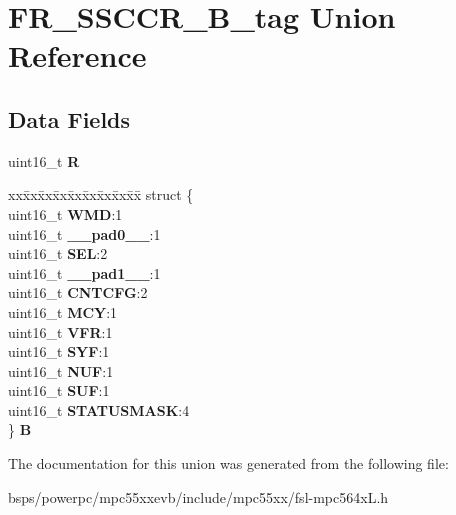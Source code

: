 \hypertarget{unionFR__SSCCR__16B__tag}{}\section{F\+R\+\_\+\+S\+S\+C\+C\+R\+\_\+B\+\_\+tag Union Reference}
\label{unionFR__SSCCR__16B__tag}
\subsection*{Data Fields}
\begin{DoxyCompactItemize}
\item 
\mbox{\label{unionFR__SSCCR__16B__tag_af067eafb4e46d3d5efeea3468877fbe4}} 
uint16\+\_\+t {\bfseries R}
\item 
\mbox{\label{unionFR__SSCCR__16B__tag_ab65ed3b735d5a0c631e1bf417d67ce4c}} 
\begin{tabbing}
xx\=xx\=xx\=xx\=xx\=xx\=xx\=xx\=xx\=\kill
struct \{\\
\>uint16\_t {\bfseries WMD}:1\\
\>uint16\_t {\bfseries \_\_pad0\_\_}:1\\
\>uint16\_t {\bfseries SEL}:2\\
\>uint16\_t {\bfseries \_\_pad1\_\_}:1\\
\>uint16\_t {\bfseries CNTCFG}:2\\
\>uint16\_t {\bfseries MCY}:1\\
\>uint16\_t {\bfseries VFR}:1\\
\>uint16\_t {\bfseries SYF}:1\\
\>uint16\_t {\bfseries NUF}:1\\
\>uint16\_t {\bfseries SUF}:1\\
\>uint16\_t {\bfseries STATUSMASK}:4\\
\} {\bfseries B}\\

\end{tabbing}\end{DoxyCompactItemize}


The documentation for this union was generated from the following file\+:\begin{DoxyCompactItemize}
\item 
bsps/powerpc/mpc55xxevb/include/mpc55xx/fsl-\/mpc564x\+L.\+h\end{DoxyCompactItemize}

